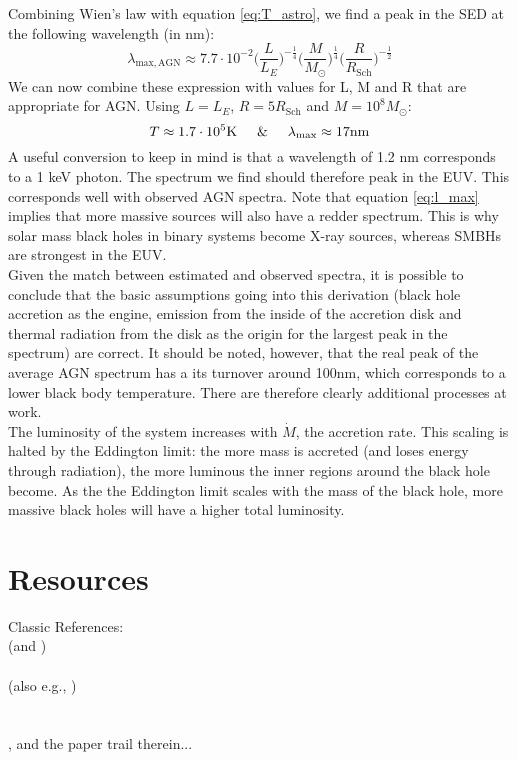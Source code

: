 \documentclass[11pt]{article}
\begin{document}
Combining Wien's law with equation \ref{eq:T_astro}, we find a peak in the SED at the following wavelength (in nm):
\begin{equation}
	\lambda_{\mathrm{max,AGN}} \approx 7.7\cdot 10^{-2}\Big(\frac{L}{L_E}\Big)^{-\frac{1}{4}}\Big(\frac{M}{M_{\odot}}\Big)^{\frac{1}{4}}\Big(\frac{R}{R_{\mathrm{Sch}}}\Big)^{-\frac{1}{2}}
	\label{eq:l_max}
\end{equation}
We can now combine these expression with values for L, M and R that are appropriate for AGN. Using $L=L_E$, $R=5R_{\mathrm{Sch}}$ and $M=10^8 M_{\odot}$:
$$
T \approx 1.7\cdot 10^5 \mathrm{K} \hspace{5mm} \& \hspace{5mm} \lambda_{\mathrm{max}} \approx 17 \mathrm{nm}
$$
A useful conversion to keep in mind is that a wavelength of 1.2 nm corresponds to a 1 keV photon. The spectrum we find should therefore peak in the EUV. This corresponds well with observed AGN spectra. Note that equation \ref{eq:l_max} implies that more massive sources will also have a redder spectrum. This is why solar mass black holes in binary systems become X-ray sources, whereas SMBHs are strongest in the EUV.\\

\noindent
Given the match between estimated and observed spectra, it is possible to conclude that the basic assumptions going into this derivation (black hole accretion as the engine, emission from the inside of the accretion disk and thermal radiation from the disk as the origin for the largest peak in the spectrum) are correct. It should be noted, however, that the real peak of the average AGN spectrum has a its turnover around 100nm, which corresponds to a lower black body temperature. There are therefore clearly additional processes at work.\\

\noindent
The luminosity of the system increases with $\dot{M}$, the accretion rate. This scaling is halted by the Eddington limit: the more mass is accreted (and loses energy through radiation), the more luminous the inner regions around the black hole become. As the the Eddington limit scales with the mass of the black hole, more massive black holes will have a higher total luminosity. 


\clearpage
\section{Resources}
Classic References:\\
\citet{SS73} (and \citet{King09}) \\
\citet{Pringle81}\\
(also e.g., \citet{Pringle72, Pringle73, Pringle96})\\
\citet{Richards06b}\\
\citet{Kishimoto08}\\
\citet{Lawrence12}, and the paper trail therein...\\
\end{document}
